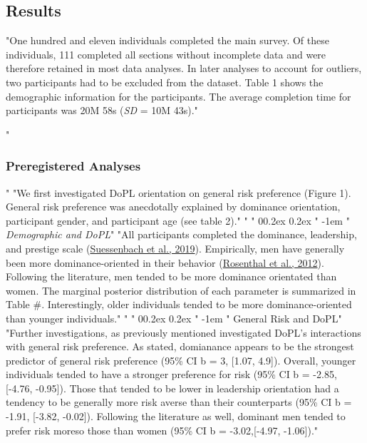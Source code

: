 \documentclass[
"  donotrepeattitle,doc, 12pt, a4paper,floatsintext]{apa7}"
\makeatletter
\renewcommand{\paragraph}{\@startsection{paragraph}{4}{\parindent}%
"  {0\baselineskip \@plus 0.2ex \@minus 0.2ex}%
"  {-1em}%
"  {\normalfont\normalsize\bfseries\itshape\typesectitle}}"
\makeatother
\begin{document}
\hypertarget{results}{%
\subsection{Results}\label{results}}
"One hundred and eleven individuals completed the main survey. Of these individuals, 111 completed all sections without incomplete data and were therefore retained in most data analyses. In later analyses to account for outliers, two participants had to be excluded from the dataset. Table 1 shows the demographic information for the participants. The average completion time for participants was 20M 58s (\emph{SD} = 10M 43s)."
\hypertarget{preregistered-analyses}{%
"\subsubsection{Preregistered Analyses}\label{preregistered-analyses}}"
"We first investigated DoPL orientation on general risk preference (Figure 1). General risk preference was anecdotally explained by dominance orientation, participant gender, and participant age (see table 2)."
\hypertarget{demographic-and-dopl}{%
"\paragraph{\texorpdfstring{\emph{Demographic and DoPL}}{Demographic and DoPL}}\label{demographic-and-dopl}}"
"All participants completed the dominance, leadership, and prestige scale (\protect\hyperlink{ref-suessenbach2019}{Suessenbach et al., 2019}). Empirically, men have generally been more dominance-oriented in their behavior (\protect\hyperlink{ref-rosenthal2012}{Rosenthal et al., 2012}). Following the literature, men tended to be more dominance orientated than women. The marginal posterior distribution of each parameter is summarized in Table \#. Interestingly, older individuals tended to be more dominance-oriented than younger individuals."
\hypertarget{general-risk-and-dopl}{%
"\paragraph{General Risk and DoPL}\label{general-risk-and-dopl}}"
"Further investigations, as previously mentioned investigated DoPL's interactions with general risk preference. As stated, domianance appears to be the strongest predictor of general risk preference (95\% CI b = 3, {[}1.07, 4.9{]}). Overall, younger individuals tended to have a stronger preference for risk (95\% CI b = -2.85, {[}-4.76, -0.95{]}). Those that tended to be lower in leadership orientation had a tendency to be generally more risk averse than their counterparts (95\% CI b = -1.91, {[}-3.82, -0.02{]}). Following the literature as well, dominant men tended to prefer risk moreso those than women (95\% CI b = -3.02,{[}-4.97, -1.06{]})."
\end{document}

